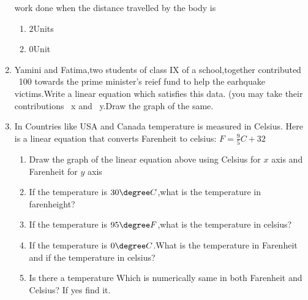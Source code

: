 \begin{enumerate}[label=\arabic*.,ref=\theenumi]
work done when the distance travelled by the body is
\begin{enumerate}[label=(\roman*)]
\item $2$Units
\item $0$Unit
\end{enumerate}
\item Yamini and Fatima,two students of class IX of a school,together
 contributed \rupee~100 towards the prime minister's reief fund to help
 the earhquake victims.Write a linear equation which satisfies this data.
 (you may take their contributions  \rupee~x and \rupee~y.Draw the graph 
 of the same.
\item In Countries like USA and Canada temperature is measured in Celsius.
Here is a linear equation that converts Farenheit to celsius:
$F=\frac{9}{5}C+32$
\begin{enumerate}[label=(\roman*)]
\item Draw the graph of the linear equation above using Celsius for $x$
 axis and Farenheit for $y$ axis
\item If the temperature is $30\degree C$,what is the temperature in farenheight?
\item If the temperature is $95\degree F$,what is the temperature in celsius?
\item If the temperature is $0\degree C$.What is the temperature in Farenheit and if the temperature in celsius?
\item Is there a temperature Which is numerically same in both Farenheit and Celsius? If yes find it.
\end{enumerate}
\end{enumerate}
